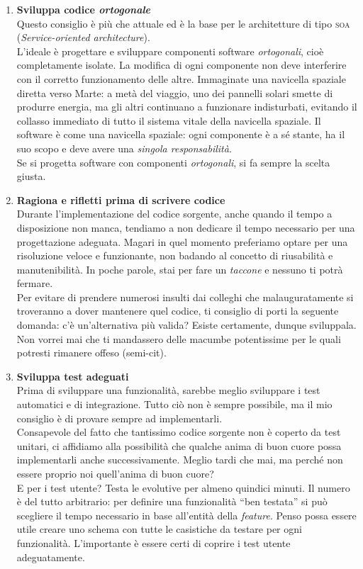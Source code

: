 \begin{enumerate}
\item \textbf{Sviluppa codice \emph{ortogonale}} \\
Questo consiglio è più che attuale ed è la base per le architetture di tipo \textsc{soa} (\emph{Service-oriented architecture}). \\
L’ideale è progettare e sviluppare componenti software \emph{ortogonali}, cioè completamente isolate. La modifica di ogni componente non deve interferire con il corretto funzionamento delle altre. Immaginate una navicella spaziale diretta verso Marte: a metà del viaggio, uno dei pannelli solari smette di produrre energia, ma gli altri continuano a funzionare indisturbati, evitando il collasso immediato di tutto il sistema vitale della navicella spaziale. Il software è come una navicella spaziale: ogni componente è a sé stante, ha il suo scopo e deve avere una \emph{singola responsabilità}. \\
Se si progetta software con componenti \emph{ortogonali}, si fa sempre la scelta giusta.

\item \textbf{Ragiona e rifletti prima di scrivere codice} \\
Durante l’implementazione del codice sorgente, anche quando il tempo a disposizione non manca, tendiamo a non dedicare il tempo necessario per una progettazione adeguata. Magari in quel momento preferiamo optare per una risoluzione veloce e funzionante, non badando al concetto di riusabilità e manutenibilità. In poche parole, stai per fare un \emph{taccone} e nessuno ti potrà fermare. \\
Per evitare di prendere numerosi insulti dai colleghi che malauguratamente si troveranno a dover mantenere quel codice, ti consiglio di porti la seguente domanda: c’è un’alternativa più valida? Esiste certamente, dunque sviluppala. Non vorrei mai che ti mandassero delle macumbe potentissime per le quali potresti rimanere offeso (semi-cit).

\item \textbf{Sviluppa test adeguati} \\
Prima di sviluppare una funzionalità, sarebbe meglio sviluppare i test automatici e di integrazione. Tutto ciò non è sempre possibile, ma il mio consiglio è di provare sempre ad implementarli. \\
Consapevole del fatto che tantissimo codice sorgente non è coperto da test unitari, ci affidiamo alla possibilità che qualche anima di buon cuore possa implementarli anche successivamente. Meglio tardi che mai, ma perché non essere proprio noi quell’anima di buon cuore? \\
E per i test utente? Testa le evolutive per almeno quindici minuti. Il numero è del tutto arbitrario: per definire una funzionalità “ben testata” si può scegliere il tempo necessario in base all’entità della \emph{feature}. Penso possa essere utile creare uno schema con tutte le casistiche da testare per ogni funzionalità. L’importante è essere certi di coprire i test utente adeguatamente.


\end{enumerate}
